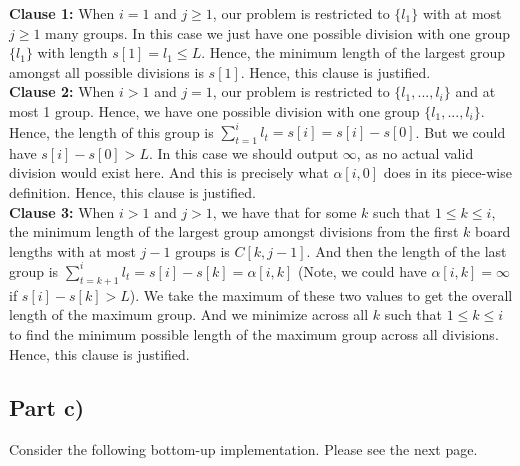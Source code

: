 \documentclass[12pt]{article}
\begin{document}
\textbf{Clause 1:} When $i = 1$ and $j \geq 1$, our problem is restricted to $\{l_1\}$ with at most $j \geq 1$ many groups. In this case we just have one possible division with one group $\{l_1\}$ with length $s[1] = l_1 \leq L$. Hence, the minimum length of the largest group amongst all possible divisions is $s[1]$. Hence, this clause is justified. \\

\textbf{Clause 2:} When $i > 1$ and $j = 1$, our problem is restricted to $\{l_1,...,l_i\}$ and at most 1 group. Hence, we have one possible division with one group $\{l_1,...,l_i\}$. Hence, the length of this group is $\sum_{t=1}^i l_t = s[i] = s[i] - s[0]$. But we could have $s[i] - s[0] > L$. In this case we should output $\infty$, as no actual valid division would exist here. And this is precisely what $\alpha[i,0]$ does in its piece-wise definition. Hence, this clause is justified. \\

\textbf{Clause 3:} When $i > 1$ and $j > 1$, we have that for some $k$ such that $1 \leq k \leq i$, the minimum length of the largest group amongst divisions from the first $k$ board lengths with at most $j-1$ groups is $C[k,j-1]$. And then the length of the last group is $\sum_{t=k+1}^i l_t = s[i] - s[k] = \alpha[i,k]$ (Note, we could have $\alpha[i,k] = \infty$ if $s[i] - s[k] > L$). We take the maximum of these two values to get the overall length of the maximum group. And we minimize across all $k$ such that $1 \leq k \leq i$ to find the minimum possible length of the maximum group across all divisions. Hence, this clause is justified. 

\subsection*{Part c)}

Consider the following bottom-up implementation. Please see the next page. 

\newpage
\end{document}
